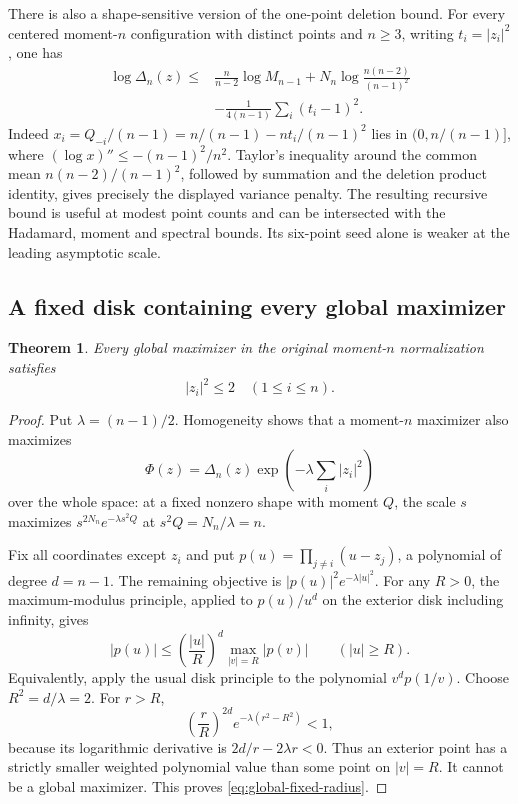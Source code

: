 \documentclass[11pt]{article}
\newtheorem{theorem}{Theorem}[section]
\theoremstyle{remark}
\numberwithin{equation}{section}
\begin{document}
There is also a shape-sensitive version of the one-point deletion bound.
For every centered moment-$n$ configuration with distinct points and
$n\ge3$, writing $t_i=|z_i|^2$, one has
\begin{equation}\label{eq:deletion-variance}
\begin{split}
 \log\Delta_n(z)\le{}&\frac n{n-2}\log M_{n-1}
  +N_n\log\frac{n(n-2)}{(n-1)^2}\\
 &-\frac1{4(n-1)}\sum_i(t_i-1)^2.
\end{split}
\end{equation}
Indeed $x_i=Q_{-i}/(n-1)=n/(n-1)-nt_i/(n-1)^2$
lies in $(0,n/(n-1)]$, where $(\log x)''\le-(n-1)^2/n^2$.
Taylor's inequality around the common mean
$n(n-2)/(n-1)^2$, followed by summation and the deletion product
identity, gives precisely the displayed variance penalty. The
resulting recursive bound is useful at modest point counts and can
be intersected with the Hadamard, moment and spectral bounds. Its
six-point seed alone is weaker at the leading asymptotic scale.

\subsection{A fixed disk containing every global maximizer}
\begin{theorem}\label{thm:global-fixed-disk}
Every global maximizer in the original moment-$n$ normalization satisfies
\begin{equation}\label{eq:global-fixed-radius}
                         |z_i|^2\le2\quad(1\le i\le n).
\end{equation}
\end{theorem}
\begin{proof}
Put $\lambda=(n-1)/2$. Homogeneity shows that a moment-$n$
maximizer also maximizes
\[
 \Phi(z)=\Delta_n(z)\exp\left(-\lambda\sum_i|z_i|^2\right)
\]
over the whole space: at a fixed nonzero shape with moment $Q$,
the scale $s$ maximizes $s^{2N_n}e^{-\lambda s^2Q}$ at
$s^2Q=N_n/\lambda=n$.

Fix all coordinates except $z_i$ and put
$p(u)=\prod_{j\ne i}(u-z_j)$, a polynomial of degree $d=n-1$.
The remaining objective is $|p(u)|^2e^{-\lambda|u|^2}$.
For any $R>0$, the maximum-modulus principle, applied to
$p(u)/u^d$ on the exterior disk including infinity, gives
\[
 |p(u)|\le\left(\frac{|u|}R\right)^d
                  \max_{|v|=R}|p(v)|\qquad(|u|\ge R).
\]
Equivalently, apply the usual disk principle to the polynomial
$v^dp(1/v)$. Choose $R^2=d/\lambda=2$. For $r>R$,
\[
 \left(\frac rR\right)^{2d}e^{-\lambda(r^2-R^2)}<1,
\]
because its logarithmic derivative is $2d/r-2\lambda r<0$.
Thus an exterior point has a strictly smaller weighted polynomial
value than some point on $|v|=R$. It cannot be a global maximizer.
This proves \eqref{eq:global-fixed-radius}.
\end{proof}
\end{document}
